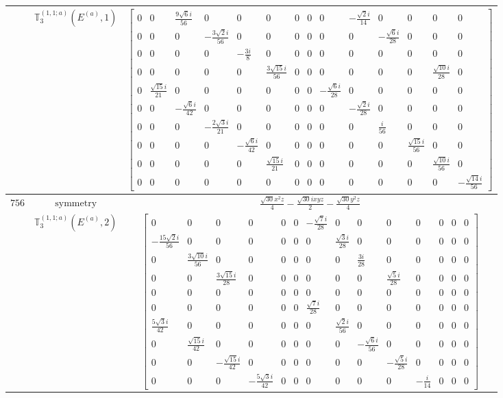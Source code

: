 \documentclass[fleqn,8pt,landscape]{jsarticle}
\begin{document}
\begin{longtable}{ccc}
$  $ & $ \mathbb{T}_{3}^{(1,1;a)}(E^{(a)},1) $ & $ \begin{bmatrix} 0 & 0 & \frac{9 \sqrt{6} i}{56} & 0 & 0 & 0 & 0 & 0 & 0 & - \frac{\sqrt{2} i}{14} & 0 & 0 & 0 & 0 \\ 0 & 0 & 0 & - \frac{3 \sqrt{2} i}{56} & 0 & 0 & 0 & 0 & 0 & 0 & - \frac{\sqrt{6} i}{28} & 0 & 0 & 0 \\ 0 & 0 & 0 & 0 & - \frac{3 i}{8} & 0 & 0 & 0 & 0 & 0 & 0 & 0 & 0 & 0 \\ 0 & 0 & 0 & 0 & 0 & \frac{3 \sqrt{15} i}{56} & 0 & 0 & 0 & 0 & 0 & 0 & \frac{\sqrt{10} i}{28} & 0 \\ 0 & \frac{\sqrt{15} i}{21} & 0 & 0 & 0 & 0 & 0 & 0 & - \frac{\sqrt{6} i}{28} & 0 & 0 & 0 & 0 & 0 \\ 0 & 0 & - \frac{\sqrt{6} i}{42} & 0 & 0 & 0 & 0 & 0 & 0 & - \frac{\sqrt{2} i}{28} & 0 & 0 & 0 & 0 \\ 0 & 0 & 0 & - \frac{2 \sqrt{3} i}{21} & 0 & 0 & 0 & 0 & 0 & 0 & \frac{i}{56} & 0 & 0 & 0 \\ 0 & 0 & 0 & 0 & - \frac{\sqrt{6} i}{42} & 0 & 0 & 0 & 0 & 0 & 0 & \frac{\sqrt{15} i}{56} & 0 & 0 \\ 0 & 0 & 0 & 0 & 0 & \frac{\sqrt{15} i}{21} & 0 & 0 & 0 & 0 & 0 & 0 & \frac{\sqrt{10} i}{56} & 0 \\ 0 & 0 & 0 & 0 & 0 & 0 & 0 & 0 & 0 & 0 & 0 & 0 & 0 & - \frac{\sqrt{14} i}{56} \end{bmatrix} $ \\ \hline
$ 756 $ & $ \text{symmetry} $ & $ \frac{\sqrt{30} x^{2} z}{4} - \frac{\sqrt{30} i x y z}{2} - \frac{\sqrt{30} y^{2} z}{4} $ \\
$  $ & $ \mathbb{T}_{3}^{(1,1;a)}(E^{(a)},2) $ & $ \begin{bmatrix} 0 & 0 & 0 & 0 & 0 & 0 & - \frac{\sqrt{7} i}{28} & 0 & 0 & 0 & 0 & 0 & 0 & 0 \\ - \frac{15 \sqrt{2} i}{56} & 0 & 0 & 0 & 0 & 0 & 0 & \frac{\sqrt{3} i}{28} & 0 & 0 & 0 & 0 & 0 & 0 \\ 0 & \frac{3 \sqrt{10} i}{56} & 0 & 0 & 0 & 0 & 0 & 0 & \frac{3 i}{28} & 0 & 0 & 0 & 0 & 0 \\ 0 & 0 & \frac{3 \sqrt{15} i}{28} & 0 & 0 & 0 & 0 & 0 & 0 & \frac{\sqrt{5} i}{28} & 0 & 0 & 0 & 0 \\ 0 & 0 & 0 & 0 & 0 & 0 & 0 & 0 & 0 & 0 & 0 & 0 & 0 & 0 \\ 0 & 0 & 0 & 0 & 0 & 0 & \frac{\sqrt{7} i}{28} & 0 & 0 & 0 & 0 & 0 & 0 & 0 \\ \frac{5 \sqrt{3} i}{42} & 0 & 0 & 0 & 0 & 0 & 0 & \frac{\sqrt{2} i}{56} & 0 & 0 & 0 & 0 & 0 & 0 \\ 0 & \frac{\sqrt{15} i}{42} & 0 & 0 & 0 & 0 & 0 & 0 & - \frac{\sqrt{6} i}{56} & 0 & 0 & 0 & 0 & 0 \\ 0 & 0 & - \frac{\sqrt{15} i}{42} & 0 & 0 & 0 & 0 & 0 & 0 & - \frac{\sqrt{5} i}{28} & 0 & 0 & 0 & 0 \\ 0 & 0 & 0 & - \frac{5 \sqrt{3} i}{42} & 0 & 0 & 0 & 0 & 0 & 0 & - \frac{i}{14} & 0 & 0 & 0 \end{bmatrix} $ \\ \hline

\end{longtable}
\end{document}
